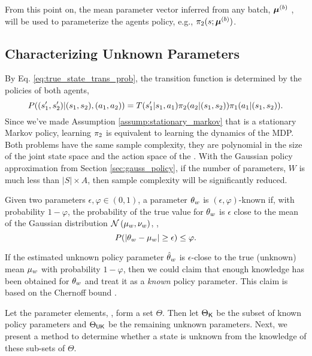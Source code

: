 \begin{remark}
    From this point on, the mean parameter vector inferred from any batch, $\boldsymbol{\mathbb{\mu}}^{(b)}$ , will be used to
    parameterize the agents policy, e.g., $\pi_{2}(s;\boldsymbol{\mathbb{\mu}}^{(b)})$.
\end{remark}


\subsection{Characterizing Unknown Parameters}\label{sec:unknown_params}
By Eq. \ref{eq:true_state_trans_prob}, the transition function is determined by the policies of both agents,
\[
P((s_1',s_2')|(s_1,s_2),(a_1,a_2)) = T(s_1'|s_1,a_1) \pi_{2}(a_2|(s_1,s_2))\pi_{1}(a_1|(s_1,s_2)).
\]
Since we've made Assumption \ref{assump:stationary_markov} that  is a stationary Markov policy, learning
$\pi_{2}$ is equivalent to learning the dynamics of the MDP. Both problems have the same sample complexity, they
are polynomial in the size of the joint state space and the action space of the . With the Gaussian policy
approximation from Section \ref{sec:gauss_policy}, if the number of parameters, $W$ is much less than $|S|\times A$,
then sample complexity will be significantly reduced.

\begin{definition}
        Given two parameters $\epsilon, \varphi \in (0,1)$, a parameter $\theta_{w}$ is $(\epsilon,
        \varphi)$-known if, with probability $1-\varphi$, the probability of the true value for $\theta_{w}$ is
        $\epsilon$ close to the mean of the Gaussian distribution $\mathcal{N}\left(\mu_{w}, \nu_{w}\right)$, \ie,
        \[
        P(\lvert\theta_{w} - \mu_{w}\rvert \ge \epsilon) \le \varphi.
        \]
\end{definition}

If the estimated unknown policy parameter $\hat{\theta}_w$ is $\epsilon$-close to the true (unknown) mean
$\mu_{w}$ with probability $1-\varphi$, then we could claim  that enough knowledge has been obtained for
$\theta_{w}$ and treat it as a \emph{known} policy parameter. This claim is based on the Chernoff bound
\cite{kobayashi2011probability}.

Let the parameter elements, \paramElem, form a set $\Theta$. Then let $\Theta_{\mathsf{K}}$ be the subset of known policy
parameters and $\Theta_{\mathsf{UK}}$ be the remaining unknown parameters.  Next, we present a method to determine whether
a state is unknown from the knowledge of these sub-sets
of $\Theta$.

